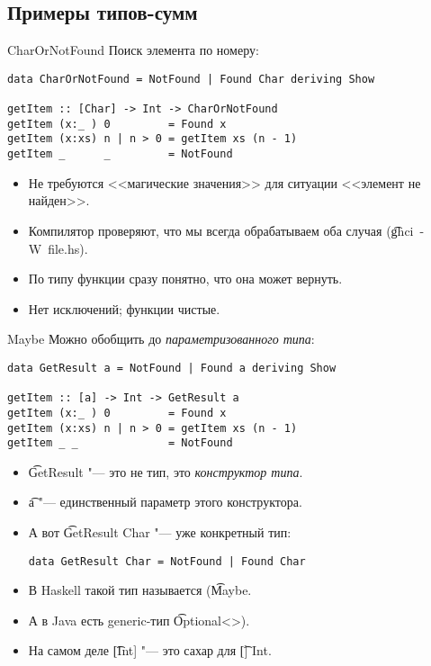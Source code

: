 \subsection{Примеры типов-сумм}
\begin{frame}
\end{frame}

\begin{frame}[fragile]{CharOrNotFound}
	Поиск элемента по номеру:
\begin{verbatim}
data CharOrNotFound = NotFound | Found Char deriving Show

getItem :: [Char] -> Int -> CharOrNotFound
getItem (x:_ ) 0         = Found x
getItem (x:xs) n | n > 0 = getItem xs (n - 1)
getItem _      _         = NotFound
\end{verbatim}
	\begin{itemize}
		\item Не требуются <<магические значения>> для ситуации <<элемент не найден>>.
		\item Компилятор проверяют, что мы всегда обрабатываем оба случая (\t{ghci~-W~file.hs}).
		\item По типу функции сразу понятно, что она может вернуть.
		\item Нет исключений; функции чистые.
	\end{itemize}	
\end{frame}


\begin{frame}[fragile]{Maybe}
	Можно обобщить до \textit{параметризованного типа}:
\begin{verbatim}
data GetResult a = NotFound | Found a deriving Show

getItem :: [a] -> Int -> GetResult a
getItem (x:_ ) 0         = Found x
getItem (x:xs) n | n > 0 = getItem xs (n - 1)
getItem _ _              = NotFound
\end{verbatim}
	\begin{itemize}
		\item \t{GetResult} "--- это не тип, это \textit{конструктор типа}.
		\item \t{a} "--- единственный параметр этого конструктора.
		\item А вот \t{GetResult Char} "--- уже конкретный тип:
\begin{verbatim}
data GetResult Char = NotFound | Found Char
\end{verbatim}
		\item В Haskell такой тип называется (\t{Maybe}.
		\item А в Java есть generic-тип \t{Optional<>}).
		\item На самом деле \t{[Int]} "--- это сахар для \t{[] Int}.
	\end{itemize}
\end{frame}

